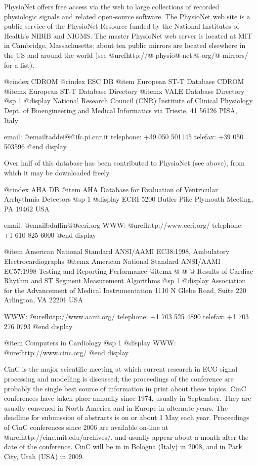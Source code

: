 {{{{{{{{PhysioNet offers free access via the web to large collections of
recorded physiologic signals and related open-source software.  The
PhysioNet web site is a public service of the PhysioNet Resource
funded by the National Institutes of Health's NIBIB and NIGMS.  The
master PhysioNet web server is located at MIT in Cambridge,
Massachusetts; about ten public mirrors are located elsewhere in the
US and around the world (see
@uref{http://@-physio@-net.@-org/@-mirrors/} for a list).

@cindex CDROM
@cindex ESC DB
@item European ST-T Database CDROM
@itemx European ST-T Database Directory
@itemx VALE Database Directory
@sp 1
@display
National Research Council (CNR) Institute of Clinical Physiology
Dept. of Bioengineering and Medical Informatics
via Trieste, 41
56126 PISA, Italy

email: @email{taddei@@ifc.pi.cnr.it}
telephone: +39 050 501145
telefax: +39 050 503596
@end display

Over half of this database has been contributed to PhysioNet (see above), from
which it may be downloaded freely.

@cindex AHA DB
@item AHA Database for Evaluation of Ventricular Arrhythmia Detectors
@sp 1
@display
ECRI
5200 Butler Pike
Plymouth Meeting, PA 19462 USA

email: @email{bduffin@@ecri.org}
WWW: @uref{http://www.ecri.org/}
telephone: +1 610 825 6000
@end display

@item American National Standard ANSI/AAMI EC38:1998, Ambulatory Electrocardiographs
@itemx American National Standard ANSI/AAMI EC57:1998 Testing and Reporting Performance
@itemx @ @ @ Results of Cardiac Rhythm and ST Segment Measurement Algorithms
@sp 1
@display
Association for the Advancement of Medical Instrumentation
1110 N Glebe Road, Suite 220
Arlington, VA 22201 USA

WWW: @uref{http://www.aami.org/}
telephone: +1 703 525 4890
telefax: +1 703 276 0793
@end display

@item Computers in Cardiology
@sp 1
@display
WWW: @uref{http://www.cinc.org/}
@end display

CinC is the major scientific meeting at which current research in ECG
signal processing and modelling is discussed; the proceedings of the
conference are probably the single best source of information in print
about these topics.  CinC conferences have taken place annually since
1974, usually in September.  They are usually convened in North
America and in Europe in alternate years.  The deadline for submission
of abstracts is on or about 1 May each year.  Proceedings of CinC
conferences since 2006 are available on-line at
@uref{http://cinc.mit.edu/archives/}, and usually appear about a month
after the date of the conference.  CinC will be in in Bologna (Italy)
in 2008, and in Park City, Utah (USA) in 2009.

}}}}}}}}
